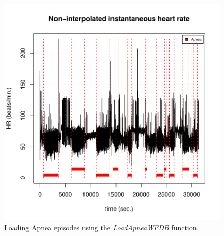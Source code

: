 \documentclass[12pt,lot, lof]{puthesis}
\begin{document}
\begin{figure}[h]
\centering
\includegraphics{figures/tutorial-loadingApneaEpisodes}
\caption{Loading Apnea episodes using the \textit{LoadApneaWFDB} 
function.\label{fig:loadingApneaEpisodes}}
\end{figure}
\end{document}
